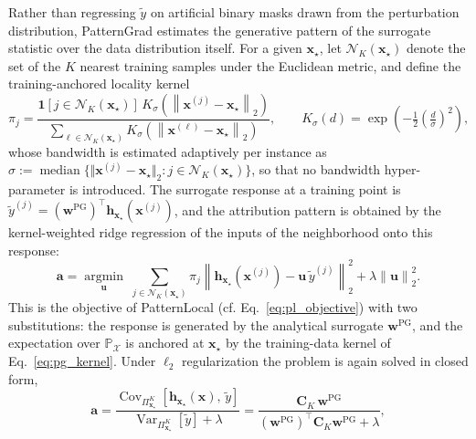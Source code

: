 \documentclass[pdflatex,sn-mathphys-num]{sn-jnl}
\theoremstyle{thmstyleone}
\theoremstyle{thmstyletwo}%
\theoremstyle{thmstylethree}%
\begin{document}
Rather than regressing $\tilde{y}$ on artificial binary masks drawn from the perturbation distribution, PatternGrad estimates the generative pattern of the surrogate statistic over the data distribution itself. For a given $\mathbf{x}_\star$, let $\mathcal{N}_K(\mathbf{x}_\star)$ denote the set of the $K$ nearest training samples under the Euclidean metric, and define the training-anchored locality kernel
\begin{equation}
    \pi_j = \frac{\mathbf{1}\!\left[j \in \mathcal{N}_K(\mathbf{x}_\star)\right] \, K_\sigma\!\left(\left\|\mathbf{x}^{(j)} - \mathbf{x}_\star\right\|_2\right)}{\sum_{\ell \in \mathcal{N}_K(\mathbf{x}_\star)} K_\sigma\!\left(\left\|\mathbf{x}^{(\ell)} - \mathbf{x}_\star\right\|_2\right)}, \qquad K_\sigma(d) = \exp\!\left(-\tfrac{1}{2}\left(\tfrac{d}{\sigma}\right)^{2}\right),
    \label{eq:pg_kernel}
\end{equation}
whose bandwidth is estimated adaptively per instance as $\sigma \mathrel{:=} \operatorname{median}\{\Vert\mathbf{x}^{(j)} - \mathbf{x}_\star\Vert_2 : j \in \mathcal{N}_K(\mathbf{x}_\star)\}$, so that no bandwidth hyper-parameter is introduced. The surrogate response at a training point is $\tilde{y}^{(j)} = (\mathbf{w}^{\text{PG}})^\top \mathbf{h}_{\mathbf{x}_\star}(\mathbf{x}^{(j)})$, and the attribution pattern is obtained by the kernel-weighted ridge regression of the inputs of the neighborhood onto this response:
\begin{equation}
    \mathbf{a} = \operatorname*{argmin}_{\mathbf{u}} \; \sum_{j \in \mathcal{N}_K(\mathbf{x}_\star)} \pi_j \left\| \mathbf{h}_{\mathbf{x}_\star}(\mathbf{x}^{(j)}) - \mathbf{u}\, \tilde{y}^{(j)} \right\|_2^2 + \lambda \left\| \mathbf{u} \right\|_2^2.
    \label{eq:pg_objective}
\end{equation}
This is the objective of PatternLocal (cf. Eq.~\eqref{eq:pl_objective}) with two substitutions: the response is generated by the analytical surrogate $\mathbf{w}^{\text{PG}}$, and the expectation over $\mathbb{P}_{\mathcal{X}}$ is anchored at $\mathbf{x}_\star$ by the training-data kernel of Eq.~\eqref{eq:pg_kernel}. Under $\ell_2$ regularization the problem is again solved in closed form,
\begin{equation}
    \mathbf{a} = \frac{\operatorname{Cov}_{\Pi^K_{\mathbf{x}_\star}}\!\left[\mathbf{h}_{\mathbf{x}_\star}(\mathbf{x}),\, \tilde{y}\right]}{\operatorname{Var}_{\Pi^K_{\mathbf{x}_\star}}[\tilde{y}] + \lambda} = \frac{\mathbf{C}_K\, \mathbf{w}^{\text{PG}}}{(\mathbf{w}^{\text{PG}})^\top \mathbf{C}_K \mathbf{w}^{\text{PG}} + \lambda},
    \label{eq:pg_closed}
\end{equation}
\end{document}
